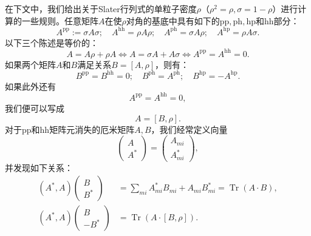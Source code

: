 在下文中，我们给出关于Slater行列式的单粒子密度$\rho$（$\rho^{2}=\rho,\sigma=1-\rho$）进行计算的一些规则。任意矩阵$A$在使$\rho$对角的基底中具有如下的$\text{pp},\text{ph},\text{hp}$和$\text{hh}$部分：
\begin{equation}
A^{\text{pp}}:=\sigma A\sigma;\quad A^{\text{hh}}=\rho A\rho;\quad A^{\text{ph}}=\sigma A\rho;\quad A^{\text{hp}}=\rho A\sigma.\label{eq:appendix_d_matrix_channels}
\end{equation}
以下三个陈述是等价的：
\begin{equation}
A=A\rho+\rho A\iff A=\sigma A+A\sigma\iff A^{\text{pp}}=A^{\text{hh}}=0.\label{eq:appendix_d_three_statements}
\end{equation}
如果两个矩阵$A$和$B$满足关系$B=[A,\rho]$，则有：
\begin{equation}
B^{\text{pp}}=B^{\text{hh}}=0;\quad B^{\text{ph}}=A^{\text{ph}};\quad B^{\text{hp}}=-A^{\text{hp}}.\label{eq:appendix_d_b_channels}
\end{equation}
如果此外还有
\begin{equation}
A^{\text{pp}}=A^{\text{hh}}=0,\label{eq:appendix_d_a_pp_hh_zero}
\end{equation}
我们便可以写成
\begin{equation}
A=[B,\rho].\label{eq:appendix_d_a_is_b_rho}
\end{equation}
对于$\text{pp}$和$\text{hh}$矩阵元消失的厄米矩阵$A,B$，我们经常定义向量
\begin{equation}
\begin{pmatrix}A\\
A^{*}
\end{pmatrix}=\begin{pmatrix}A_{mi}\\
A^{*}_{mi}
\end{pmatrix},\label{eq:appendix_d_vector_def}
\end{equation}
并发现如下关系：
\begin{align}
(A^{*},A)\begin{pmatrix}B\\
B^{*}
\end{pmatrix} & =\sum_{mi}A^{*}_{mi}B_{mi}+A_{mi}B^{*}_{mi}=\mathop{\text{Tr}}(A\cdot B),\nonumber \\
(A^{*},A)\begin{pmatrix}B\\
-B^{*}
\end{pmatrix} & =\mathop{\text{Tr}}(A\cdot[B,\rho]).\label{eq:appendix_d_vector_relations}
\end{align}

